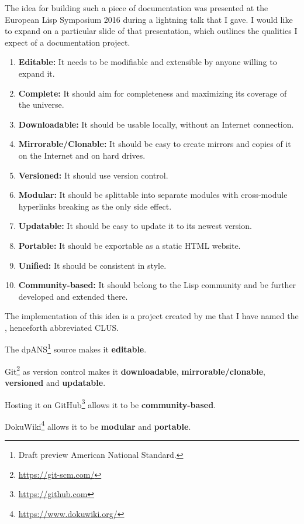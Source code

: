 The idea for building such a piece of documentation was presented at the European Lisp Symposium 2016 during a lightning talk\cite{els:2016:clus} that I gave. I would like to expand on a particular slide of that presentation, which outlines the qualities I expect of a \cl{} documentation project.
\begin{enumerate}
\item \textbf{Editable:}
It needs to be modifiable and extensible by anyone willing to expand it.
\item \textbf{Complete:}
It should aim for completeness and maximizing its coverage of the \cl{} universe.
\item \textbf{Downloadable:}
It should be usable locally, without an Internet connection.
\item \textbf{Mirrorable/Clonable:}
It should be easy to create mirrors and copies of it on the Internet and on hard drives.
\item \textbf{Versioned:}
It should use version control.
\item \textbf{Modular:}
It should be splittable into separate modules with cross-module hyperlinks breaking as the only side effect.
\item \textbf{Updatable:}
It should be easy to update it to its newest version.
\item \textbf{Portable:}
It should be exportable as a static HTML website.
\item \textbf{Unified:}
It should be consistent in style.
\item \textbf{Community-based:}
It should belong to the Lisp community and be further developed and extended there.
\end{enumerate}

The implementation of this idea is a project created by me that I have named the \cl{} \us{}, henceforth abbreviated CLUS.

The dpANS\footnote{Draft preview American National Standard.} source\cite{ANSI:1994:draft} makes it \textbf{editable}.

Git\footnote{\url{https://git-scm.com/}} as version control makes it \textbf{downloadable}, \textbf{mirrorable/clonable}, \textbf{versioned} and \textbf{updatable}.

Hosting it on GitHub\footnote{\url{https://github.com}} allows it to be \textbf{community-based}.

DokuWiki\footnote{\url{https://www.dokuwiki.org/}} allows it to be \textbf{modular} and \textbf{portable}.

